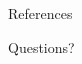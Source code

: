 \documentclass[10pt]{beamer}
\newcommand{\themename}{\textbf{\textsc{metropolis}}\xspace}
\begin{document}




\begin{frame}{References}


\end{frame}









\begin{frame}[standout]
  Questions?
\end{frame}
\end{document}
